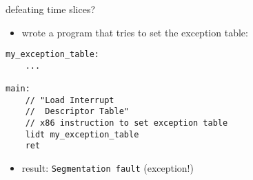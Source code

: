\begin{frame}[fragile,label=defeatTimeSlice2]{defeating time slices?}
\begin{itemize}
\item wrote a program that tries to set the exception table:
\end{itemize}
\begin{lstlisting}[style=small,language=myasm]
my_exception_table:
    ...

main:
    // "Load Interrupt
    //  Descriptor Table"
    // x86 instruction to set exception table
    lidt my_exception_table
    ret
\end{lstlisting}
\begin{itemize}
\item result: {\color{red!90}\tt Segmentation fault} (exception!)
\end{itemize}
\end{frame}


